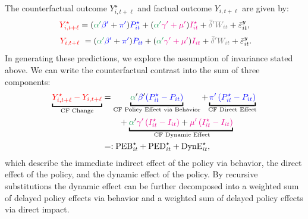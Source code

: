 \documentclass[11pt,reqno,letter]{amsart}
\theoremstyle{definition}
\def\bcolor{\color{ForestGreen}}
\def\pcolor{\color{blue}}
\def\icolor{\color{magenta}}
\def\wcolor{\color{gray}}
\def\ycolor{\color{red}}
\begin{document}
The counterfactual outcome $Y^\star_{i,t+\ell}$  and  factual outcome $Y_{i,t+\ell}$  are given by:
$$
 {\ycolor Y^\star_{i,t+\ell}} = ( {\bcolor\alpha '} {\pcolor \beta'}  + {\pcolor\pi'})
    {\pcolor P^\star_{it}} + ({\bcolor\alpha '}  {\icolor \gamma' + \mu'})
    {\icolor I^\star_{it} }+ {\wcolor \bar \delta 'W_{it}} + \bar \varepsilon_{it}^y, $$$$\ {\ycolor Y_{i,t+\ell}} \ =
    ( {\bcolor\alpha '}  {\pcolor \beta'} + {\pcolor\pi'})
    {\pcolor P_{it}} + ({\bcolor\alpha '}  {\icolor \gamma' + \mu'})
    {\icolor I_{it} }+ {\wcolor \bar \delta 'W_{it}} + \bar \varepsilon_{it}^y.
$$
In generating these predictions, we explore the assumption of invariance stated above.
We can write  the counterfactual contrast into the sum of three components:
  \begin{align}
 \underbracket{{\ycolor Y^\star_{i,t+\ell} -  Y_{i,t+\ell} }}_{\text{CF Change}} & =
\underbracket{{\bcolor\alpha}' {\pcolor\beta}' {\pcolor\left(P^\star_{it} - P_{it} \right)}}_{\text{CF Policy Effect via Behavior}}  +    {\underbracket{\pcolor\pi' \left( P^\star_{it} -  P_{it} \right)}_{\text{CF Direct  Effect}} } \nonumber\\
&\qquad +  {\underbracket{{\bcolor\alpha}' {\icolor{\gamma}'  \left( I^\star_{it} - I_{it} \right)}+ {\icolor{\mu}'  \left( I^\star_{it} -  I_{it} \right)}}_{\text{ CF Dynamic Effect}}} \nonumber \\
 & =:   \mathrm{PEB}^\star_{it} + \mathrm{PED}^\star_{it} + \mathrm{DynE}^\star_{it}, \label{eqn:DC2}
  \end{align}
 which describe the immediate indirect effect of the policy via behavior, the direct effect of the policy, and the dynamic effect
 of the policy.  By recursive substitutions the dynamic effect  can be further decomposed into a weighted sum of delayed policy effects via behavior and a weighted sum of delayed policy effects via direct impact.


 
\end{document}
